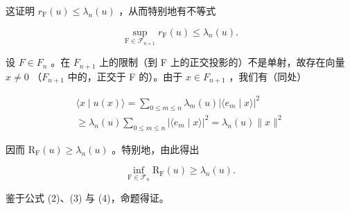 这证明 \(r_{\mathrm{F}}(u)\leqslant\lambda_{n}(u)\) ，从而特别地有不等式

\[
\sup _ {\mathrm{F} \in \mathscr {F} _ {n + 1}} r _ {\mathrm{F}} (u) \leqslant \lambda_ {n} (u).\tag{3}
\]

设 \(F \in F_{n}\) 。在 \(F_{n+1}\) 上的限制（到 F 上的正交投影的）不是单射，故存在向量 \(x \neq 0\) （\(F_{n+1}\) 中的，正交于 F 的）。由于 \(x \in F_{n+1}\) ，我们有（同处）

\[
\begin{array}{c} \langle x \mid u (x) \rangle = \sum_ {0 \leqslant m \leqslant n} \lambda_ {m} (u) | \langle e _ {m} \mid x \rangle | ^ {2} \\ \geqslant \lambda_ {n} (u) \sum_ {0 \leqslant m \leqslant n} | \langle e _ {m} \mid x \rangle | ^ {2} = \lambda_ {n} (u) \| x \| ^ {2} \end{array}
\]

因而 \(\mathrm{R_F}(u) \geqslant \lambda_n(u)\) 。特别地，由此得出

\[
\inf _ {\mathrm{F} \in \mathcal {F} _ {n}} \mathrm{R} _ {\mathrm{F}} (u) \geqslant \lambda_ {n} (u).\tag{4}
\]

鉴于公式 (2)、(3) 与 (4)，命题得证。

